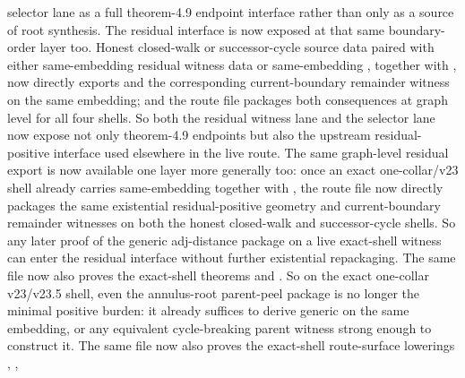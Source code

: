 \documentclass[11pt]{article}
\begin{document}
\begin{itemize}
selector lane as a full theorem-4.9 endpoint interface rather than only as a
source of root synthesis.  The residual interface is now exposed at that same
boundary-order layer too.  Honest closed-walk or successor-cycle source data
paired with either same-embedding residual witness data or same-embedding
, together with
, now directly exports
 and the
corresponding current-boundary remainder witness on the same embedding; and the
route file packages both consequences at graph level for all four shells.  So
both the residual witness lane and the selector lane now expose not only
theorem-4.9 endpoints but also the upstream residual-positive interface used
elsewhere in the live route.  The same graph-level residual export is now available one
layer more generally too: once an exact one-collar/v23 shell already carries
same-embedding  together with
, the route file now directly packages the
same existential residual-positive geometry and current-boundary remainder
witnesses on both the honest closed-walk and successor-cycle shells.  So any
later proof of the generic adj-distance package on a live exact-shell witness
can enter the residual interface without further existential repackaging.  The
same file now also proves the
exact-shell theorems
and
.
So on the exact one-collar v23/v23.5 shell, even the annulus-root parent-peel
package is no longer the minimal positive burden: it already suffices to
derive generic  on the same
embedding, or any equivalent cycle-breaking parent witness strong enough to
construct it.  The same file now also proves the exact-shell route-surface
lowerings
,
,

\end{itemize}
\end{document}
